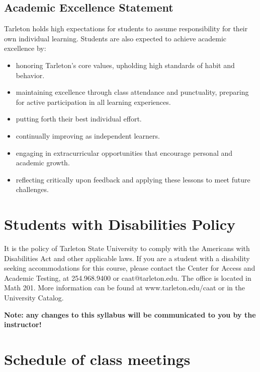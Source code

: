 \documentclass[10pt]{article}
\begin{document}
\subsection*{Academic Excellence Statement}
\label{sec:org0a192f5}
Tarleton holds high expectations for students to assume responsibility for their own individual learning. Students are also expected to achieve academic excellence by:
\begin{itemize}
\item honoring Tarleton’s core values, upholding high standards of habit and behavior.
\item maintaining excellence through class attendance and punctuality, preparing for active participation in all learning experiences.
\item putting forth their best individual effort.
\item continually improving as independent learners.
\item engaging in extracurricular opportunities that encourage personal and academic growth.
\item reflecting critically upon feedback and applying these lessons to meet future challenges.
\end{itemize}

\section*{Students with Disabilities Policy}
\label{sec:org0634558}

It is the policy of Tarleton State University to comply with the Americans with Disabilities Act and other applicable laws. If you are a student with a disability seeking accommodations for this course, please contact the Center for Access and Academic Testing, at 254.968.9400 or caat@tarleton.edu. The office is located in Math 201. More information can be found at www.tarleton.edu/caat or in the University Catalog.

\textbf{\textbf{Note:  any changes to this syllabus will be communicated to you by the instructor!}}

\section*{Schedule of class meetings}
\label{sec:orgb6e4ebd}
\end{document}
